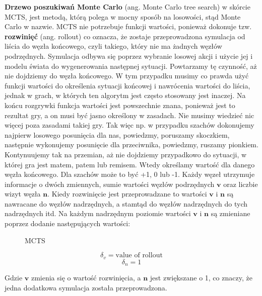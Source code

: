 \textbf{Drzewo poszukiwań Monte Carlo} (ang. Monte Carlo tree search) w skórcie MCTS, jest metodą, którą polega w mocny sposób na losowości, stąd Monte Carlo w nazwie. MCTS nie potrzebuje funkcji wartości, ponieważ dokonuje tzw. \textbf{rozwinięć} (ang. rollout) co oznacza, że zostaje przeprowadzona symulacja od liścia do węzła końcowego, czyli takiego, który nie ma żadnych węzłów podrzędnych. Symulacja odbywa się poprzez wybranie losowej akcji i użycie jej i modelu świata do wygenerowania następnej sytuacji. Powtarzamy tę czynność, aż nie dojdziemy do węzła końcowego. W tym przypadku musimy co prawda użyć funkcji wartości do określenia sytuacji końcowej i nawrócenia wartości do liścia, jednak w grach, w których ten algorytm jest często stosowany jest inaczej. Na końcu rozgrywki funkcja wartości jest powszechnie znana, ponieważ jest to rezultat gry, a on musi być jasno określony w zasadach. Nie musimy wiedzieć nic więcej poza zasadami takiej gry. Tak więc np. w przypadku szachów dokonujemy najpierw losowego posunięcia dla nas, powiedzmy, poruszamy skoczkiem, następnie wykonujemy posunięcie dla przeciwnika, powiedzmy, ruszamy pionkiem. Kontynuujemy tak na przemian, aż nie dojdziemy przypadkowo do sytuacji, w której gra jest matem, patem lub remisem. Wtedy określamy wartość dla danego węzła końcowego. Dla szachów może to być +1, 0 lub -1. Każdy węzeł utrzymuje informacje o dwóch zmiennych, sumie wartości węzłów podrzędnych $\boldsymbol{v}$ oraz liczbie wizyt węzła $\boldsymbol{n}$. Kiedy rozwinięcie jest przeprowadzane to wartości $\boldsymbol{v}$ i $\boldsymbol{n}$ są nawracane do węzłów nadrzędnych, a stamtąd do węzłów nadrzędnych do tych nadrzędnych itd. Na każdym nadrzędnym poziomie wartości $\boldsymbol{v}$ i $\boldsymbol{n}$ są zmieniane poprzez dodanie następujących wartości:

\clearpage
\begin{figure}[H]
\centering

\caption{MCTS}
\end{figure}
\clearpage

\begin{equation}
\delta_v = \text{value of rollout}
\end{equation}
\begin{equation}
\delta_n = 1
\end{equation}

\noindent Gdzie $\boldsymbol{v}$ zmienia się o wartość rozwinięcia, a $\boldsymbol{n}$ jest zwiększane o 1, co znaczy, że jedna dodatkowa symulacja została przeprowadzona.\newline

